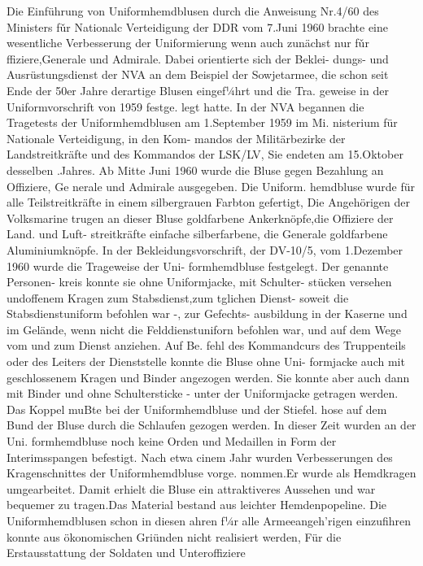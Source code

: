 

Die Einführung von Uniformhemdblusen durch die
Anweisung Nr.4/60 des Ministers fǔr Nationalc
Verteidigung der DDR vom 7.Juni 1960 brachte
eine wesentliche Verbesserung der Uniformierung
wenn auch zunächst nur fǔr ffiziere,Generale
und Admirale. Dabei orientierte sich der Beklei-
dungs- und Ausrüstungsdienst der NVA an dem
Beispiel der Sowjetarmee, die schon seit Ende der
50er Jahre derartige Blusen eingef¼hrt und die Tra.
geweise in der Uniformvorschrift von 1959 festge.
legt hatte. In der NVA begannen die Tragetests der
Uniformhemdblusen am 1.September 1959 im Mi.
nisterium für Nationale Verteidigung, in den Kom-
mandos der Militärbezirke der Landstreitkräfte und
des Kommandos der LSK/LV, Sie endeten am
15.Oktober desselben .Jahres. Ab Mitte Juni 1960
wurde die Bluse gegen Bezahlung an Offiziere, Ge
nerale und Admirale ausgegeben. Die Uniform.
hemdbluse wurde für alle Teilstreitkräfte in einem
silbergrauen Farbton gefertigt, Die Angehörigen
der Volksmarine trugen an dieser Bluse goldfarbene
Ankerknöpfe,die Offiziere der Land. und Luft-
streitkräfte einfache silberfarbene, die Generale
goldfarbene Aluminiumknöpfe.
In der Bekleidungsvorschrift, der DV-10/5, vom
1.Dezember 1960 wurde die Trageweise der Uni-
formhemdbluse festgelegt. Der genannte Personen-
kreis konnte sie ohne Uniformjacke, mit Schulter-
stücken versehen undoffenem
Kragen zum
Stabsdienst,zum tglichen Dienst- soweit die
Stabsdienstuniform befohlen war -, zur Gefechts-
ausbildung in der Kaserne und im Gelände, wenn
nicht die Felddienstuniforn befohlen war, und auf
dem Wege vom und zum Dienst anziehen. Auf Be.
fehl des Kommandcurs des Truppenteils oder des
Leiters der Dienststelle konnte die Bluse ohne Uni-
formjacke auch mit geschlossenem Kragen und Binder angezogen werden. Sie konnte aber auch
dann mit Binder und ohne Schultersticke - unter
der Uniformjacke getragen werden. Das Koppel
muBte bei der Uniformhemdbluse und der Stiefel.
hose auf dem Bund der Bluse durch die Schlaufen
gezogen werden. In dieser Zeit wurden an der Uni.
formhemdbluse noch keine Orden und Medaillen
in Form der Interimsspangen befestigt.
Nach etwa cinem Jahr wurden Verbesserungen
des Kragenschnittes der Uniformhemdbluse vorge.
nommen.Er wurde als Hemdkragen umgearbeitet.
Damit erhielt die Bluse ein attraktiveres Aussehen
und war bequemer zu tragen.Das Material bestand
aus leichter Hemdenpopeline.
Die Uniformhemdblusen schon in diesen ahren
f¼r alle Armeeangeh'rigen einzufihren konnte aus
ökonomischen Griünden nicht realisiert werden, Für
die Erstausstattung der Soldaten und Unteroffiziere
